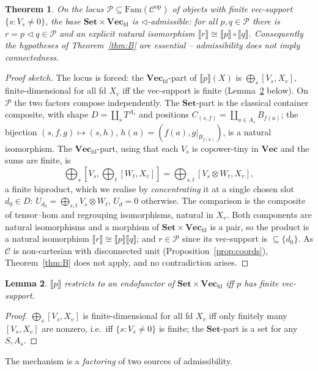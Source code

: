 \documentclass[11pt]{amsart}
\theoremstyle{plain}
\newtheorem{theorem}{Theorem}[section]
\newtheorem{lemma}[theorem]{Lemma}
\theoremstyle{definition}
\newcommand{\C}{\mathcal{C}}
\newcommand{\Fam}{\mathrm{Fam}}
\newcommand{\ext}[1]{\llbracket #1 \rrbracket}
\newcommand{\Setb}{\mathbf{Set}}
\newcommand{\Vecb}{\mathbf{Vec}}
\newcommand{\Vecfd}{\mathbf{Vec}_{\mathrm{fd}}}
\newcommand{\op}{\mathrm{op}}
\newcommand{\comp}{\mathbin{\triangleleft}}
\begin{document}
\begin{theorem}\label{thm:setxvec}
On the locus $\mathcal P\subseteq\Fam(\C^{\op})$ of objects with finite \emph{vec-support}
$\{s:V_s\neq0\}$, the base $\Setb\times\Vecfd$ is $\comp$-admissible: for all $p,q\in\mathcal P$ there
is $r=p\comp q\in\mathcal P$ and an explicit natural isomorphism $\ext r\cong\ext p\circ\ext q$.
Consequently the hypotheses of Theorem~\ref{thm:B} are essential -- admissibility does not imply
connectedness.
\end{theorem}
\begin{proof}[Proof sketch]
The locus is forced: the $\Vecfd$-part of $\ext p(X)$ is $\bigoplus_s[V_s,X_v]$, finite-dimensional for
all fd $X_v$ iff the vec-support is finite (Lemma~\ref{lem:1.1} below). On $\mathcal P$ the two factors
compose independently. The $\Setb$-part is the classical container composite, with shape
$D=\coprod_s T^{A_s}$ and positions $C_{(s,f)}=\coprod_{a\in A_s}B_{f(a)}$; the bijection
$(s,f,g)\mapsto(s,h)$, $h(a)=(f(a),g|_{B_{f(a)}})$, is a natural isomorphism. The $\Vecfd$-part, using
that each $V_s$ is copower-tiny in $\Vecb$ and the sums are finite, is
\[
   \bigoplus_s[V_s,\textstyle\bigoplus_t[W_t,X_v]]=\bigoplus_{s,t}[V_s\otimes W_t,X_v],
\]
a finite biproduct, which we realise by \emph{concentrating} it at a single chosen slot $d_0\in D$:
$U_{d_0}=\bigoplus_{s,t}V_s\otimes W_t$, $U_d=0$ otherwise. The comparison is the composite of
tensor--hom and regrouping isomorphisms, natural in $X_v$. Both components are natural isomorphisms and
a morphism of $\Setb\times\Vecfd$ is a pair, so the product is a natural isomorphism $\ext r\cong
\ext p\ext q$; and $r\in\mathcal P$ since its vec-support is $\subseteq\{d_0\}$. As $\C$ is
non-cartesian with disconnected unit (Proposition~\ref{prop:coords}), Theorem~\ref{thm:B} does not
apply, and no contradiction arises.
\end{proof}

\begin{lemma}\label{lem:1.1}
$\ext p$ restricts to an endofunctor of $\Setb\times\Vecfd$ iff $p$ has finite vec-support.
\end{lemma}
\begin{proof}
$\bigoplus_s[V_s,X_v]$ is finite-dimensional for all fd $X_v$ iff only finitely many $[V_s,X_v]$ are
nonzero, i.e.\ iff $\{s:V_s\neq0\}$ is finite; the $\Setb$-part is a set for any $S,A_s$.
\end{proof}

The mechanism is a \emph{factoring} of two sources of admissibility.
\end{document}
